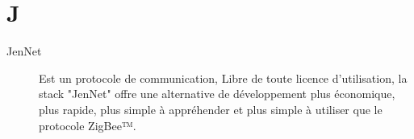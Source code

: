 \section{J}

\begin{description}

\item [JenNet]
Est un protocole de communication, Libre de toute licence d'utilisation, la stack "JenNet" offre une alternative de développement plus économique, plus rapide, plus simple à appréhender et plus simple à utiliser que le protocole ZigBee™.

\end{description}